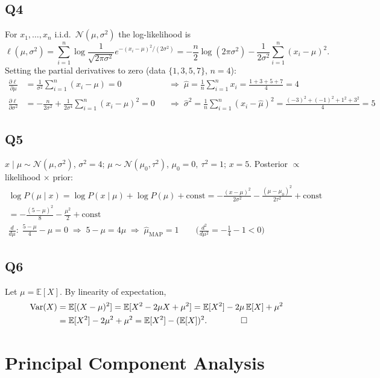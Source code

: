\documentclass[11pt]{article}
\DeclareMathOperator{\Var}{Var}
\newcommand{\E}{\mathbb{E}}
\begin{document}
\subsection{Q4}
For $x_1,\dots,x_n$ i.i.d.\ $\mathcal N(\mu,\sigma^2)$ the log-likelihood is
\[
\ell(\mu,\sigma^2)=\sum_{i=1}^{n}\log\frac{1}{\sqrt{2\pi\sigma^2}}
e^{-(x_i-\mu)^2/(2\sigma^2)}
=-\frac n2\log(2\pi\sigma^2)-\frac{1}{2\sigma^2}\sum_{i=1}^{n}(x_i-\mu)^2 .
\]
Setting the partial derivatives to zero (data $\{1,3,5,7\}$, $n=4$):
\begin{align*}
\frac{\partial\ell}{\partial\mu}&=\frac{1}{\sigma^2}\sum_{i=1}^{n}(x_i-\mu)=0
&&\Rightarrow\;\hat\mu=\frac1n\sum_{i=1}^{n}x_i=\frac{1+3+5+7}{4}=4\\
\frac{\partial\ell}{\partial\sigma^2}&=-\frac{n}{2\sigma^2}+\frac{1}{2\sigma^4}\sum_{i=1}^{n}(x_i-\mu)^2=0
&&\Rightarrow\;\hat\sigma^2=\frac1n\sum_{i=1}^{n}(x_i-\hat\mu)^2=\frac{(-3)^2+(-1)^2+1^2+3^2}{4}=5
\end{align*}

\subsection{Q5}
$x\mid\mu\sim\mathcal N(\mu,\sigma^2)$, $\sigma^2=4$; $\mu\sim\mathcal N(\mu_0,\tau^2)$,
$\mu_0=0,\ \tau^2=1$; $x=5$. Posterior $\propto$ likelihood $\times$ prior:
\begin{gather*}
\log P(\mu\mid x)=\log P(x\mid\mu)+\log P(\mu)+\text{const}
=-\frac{(x-\mu)^2}{2\sigma^2}-\frac{(\mu-\mu_0)^2}{2\tau^2}+\text{const}\\
=-\frac{(5-\mu)^2}{8}-\frac{\mu^2}{2}+\text{const}\\
\frac{d}{d\mu}:\;\frac{5-\mu}{4}-\mu=0\;\Rightarrow\;5-\mu=4\mu\;\Rightarrow\;\hat\mu_{\mathrm{MAP}}=1
\qquad\Big(\tfrac{d^2}{d\mu^2}=-\tfrac14-1<0\Big)
\end{gather*}

\subsection{Q6}\label{sec:varexp}
Let $\mu=\E[X]$. By linearity of expectation,
\begin{align*}
\Var(X)&=\E[(X-\mu)^2]=\E[X^2-2\mu X+\mu^2]
=\E[X^2]-2\mu\,\E[X]+\mu^2\\
&=\E[X^2]-2\mu^2+\mu^2=\E[X^2]-(\E[X])^2 .\qquad\qed
\end{align*}

\section{Principal Component Analysis}
\end{document}
